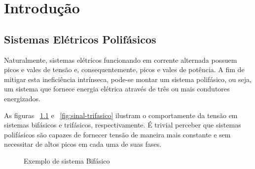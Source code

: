 \documentclass[12pt,a4paper,openany]{abntex2}
\begin{document}
	
\imprimircapa	
\imprimirfolhaderosto

\clearpage
\cleardoublepage
\cleardoublepage

\setcounter{page}{3}

\tableofcontents
\clearpage{\pagestyle{empty}\cleardoublepage}
	
\chapter{Introdução}

\section{Sistemas Elétricos Polifásicos}

Naturalmente, sistemas elétricos funcionando em corrente alternada possuem picos e vales de tensão e, consequentemente, picos e vales de potência. A fim de mitigar esta ineficiência intrínseca, pode-se montar um sistema polifásico, ou seja, um sistema que fornece energia elétrica através de três ou mais condutores energizados.

As figuras ~\ref{fig:sinal-bifasico} e ~\ref{fig:sinal-trifasico} ilustram o comportamente da tensão em sistemas bifásicos e trifásicos, respectivamente. É trivial perceber que sistemas polifásicos são capazes de fornecer tensão de maneira mais constante e sem necessitar de altos picos em cada uma de suas fases.
 
\begin{figure}[!htp]
	\centering
		\caption{Exemplo de sistema Bifásico}
	\label{fig:sinal-bifasico}
\end{figure}
\end{document}
